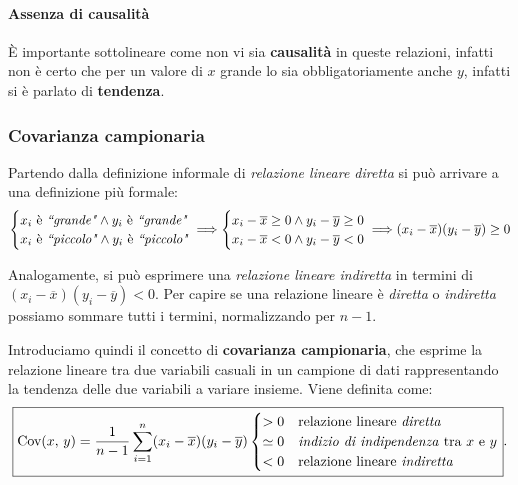 \paragraph{Assenza di causalità} È importante sottolineare come non vi sia \textbf{causalità} in queste relazioni, infatti non è certo che per un valore di $x$ grande lo sia obbligatoriamente anche $y$, infatti si è parlato di \textbf{tendenza}.


\subsubsection{Covarianza campionaria}
\noindent Partendo dalla definizione informale di \textit{relazione lineare diretta} si può arrivare a una definizione più formale: 
\begin{align*}
    \begin{cases}
    x_i \text{ è \textit{``grande"}} \land y_i \text{ è \textit{``grande"}} \\
    x_i \text{ è \textit{``piccolo"}} \land y_i \text{ è \textit{``piccolo"}}
    \end{cases} \hspace{-8pt} \Longrightarrow 
    \begin{cases}
    x_i - \overline x \geq 0 \land y_i - \overline y \geq 0 \\
    x_i - \overline x < 0 \land y_i - \overline y < 0
    \end{cases} \hspace{-8pt} \Longrightarrow 
    (x_i - \overline x)(y_i - \overline y) \geq 0
\end{align*}

\noindent Analogamente, si può esprimere una \textit{relazione lineare indiretta}  in termini di $(x_i - \overline x)(y_i - \overline y) < 0$. 
Per capire se una relazione lineare è \textit{diretta} o \textit{indiretta} possiamo sommare tutti i termini, normalizzando per $n-1$. 

\noindent Introduciamo quindi il concetto di \textbf{covarianza campionaria}, che esprime la relazione lineare tra due variabili casuali in un campione di dati rappresentando la tendenza delle due variabili a variare insieme. Viene definita come: \[
\boxed{
\text{Cov($x, \, y$)} =
\frac{1}{n-1} \sum_{i = 1}^n (x_i - \overline x) (y_i - \overline y)
\begin{cases}
> 0 & \text{relazione lineare \textit{diretta}} \\
\simeq 0 & \text{\textit{indizio di indipendenza} tra $x$ e $y$} \\
< 0 & \text{relazione lineare \textit{indiretta}}
\end{cases}
}.
\]

